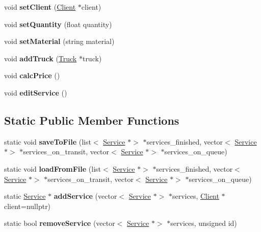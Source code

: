 \begin{DoxyCompactItemize}
\mbox{\label{class_service_a1cf3d0b85e44bd7ec58e4a12a7432aef}} 
void {\bfseries set\+Client} (\hyperlink{class_client}{Client} $\ast$client)
\item 
\mbox{\label{class_service_a29386f4e82e1de1f654468d4a020c6a4}} 
void {\bfseries set\+Quantity} (float quantity)
\item 
\mbox{\label{class_service_a9fcafc3bcbdc0b436860ee5626c69ce1}} 
void {\bfseries set\+Material} (string material)
\item 
\mbox{\label{class_service_aa6203cff9343cb8e7bf996514f14179d}} 
void {\bfseries add\+Truck} (\hyperlink{class_truck}{Truck} $\ast$truck)
\item 
\mbox{\label{class_service_a9efe3e195062d8f668e49be1759d325c}} 
void {\bfseries calc\+Price} ()
\item 
\mbox{\label{class_service_a351a27eebc07d1ff3f433d6ad356925a}} 
void {\bfseries edit\+Service} ()
\end{DoxyCompactItemize}
\subsection*{Static Public Member Functions}
\begin{DoxyCompactItemize}
\item 
\mbox{\label{class_service_aa3672a3a070ca951f5b66075a5d4c339}} 
static void {\bfseries save\+To\+File} (list$<$ \hyperlink{class_service}{Service} $\ast$$>$ $\ast$services\+\_\+finished, vector$<$ \hyperlink{class_service}{Service} $\ast$$>$ $\ast$services\+\_\+on\+\_\+transit, vector$<$ \hyperlink{class_service}{Service} $\ast$$>$ $\ast$services\+\_\+on\+\_\+queue)
\item 
\mbox{\label{class_service_add72b2a9e781bdb20a26bdff39952088}} 
static void {\bfseries load\+From\+File} (list$<$ \hyperlink{class_service}{Service} $\ast$$>$ $\ast$services\+\_\+finished, vector$<$ \hyperlink{class_service}{Service} $\ast$$>$ $\ast$services\+\_\+on\+\_\+transit, vector$<$ \hyperlink{class_service}{Service} $\ast$$>$ $\ast$services\+\_\+on\+\_\+queue)
\item 
\mbox{\label{class_service_a9e1aa933d52a23d5e265666bdedea0f1}} 
static \hyperlink{class_service}{Service} $\ast$ {\bfseries add\+Service} (vector$<$ \hyperlink{class_service}{Service} $\ast$$>$ $\ast$services, \hyperlink{class_client}{Client} $\ast$client=nullptr)
\item 
\mbox{\label{class_service_af2ca48ced14708abeb5f92f10245241c}} 
static bool {\bfseries remove\+Service} (vector$<$ \hyperlink{class_service}{Service} $\ast$$>$ $\ast$services, unsigned id)
\end{DoxyCompactItemize}
